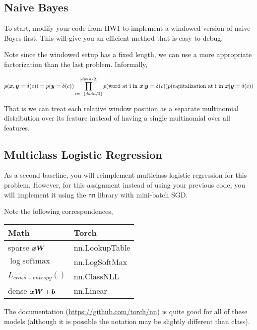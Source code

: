 \documentclass[11pt]{article}
\begin{document}
\subsection{Naive Bayes}

To start, modify your code from HW1
to implement a windowed version of
naive Bayes first. This will give
you an efficient method that is easy
to debug.

Note since the windowed setup has a fixed length, we can use a more appropriate 
factorization than the last problem. Informally,

\[ p(\boldsymbol{x}, \boldsymbol{y}=\delta(c)) = p(\boldsymbol{y}=\delta(c)) \prod_{i=-\lfloor{dwin/2}\rfloor}^{\lfloor{dwin/2}\rfloor}
p(\mathrm{word\ at\ i\ in\ }\boldsymbol{x} | \boldsymbol{y} =\delta(c))
p(\mathrm{capitalization\ at\ i\ in\ }\boldsymbol{x} | \boldsymbol{y} =\delta(c)) \]

That is we can treat each relative window position as a separate
multinomial distribution over its feature instead of having a single
multinomial over all features.


\subsection{Multiclass Logistic Regression}

As a second baseline, you will reimplement multiclass logistic
regression for this problem. However, for this assignment instead of
using your previous code, you will implement it using the \texttt{nn}
library with mini-batch SGD.



Note the following correspondences,

\begin{center}
  \begin{tabular}{ll}
    \toprule
    Math & Torch \\
    \midrule 
    sparse $\boldsymbol{x} \boldsymbol{W}$ & nn.LookupTable \\ 
    $\log \mathrm{softmax}$ & nn.LogSoftMax \\ 
    $L_{cross-entropy}()$ & nn.ClassNLL \\ 
    dense $\boldsymbol{x} \boldsymbol{W} + \boldsymbol{b}$ & nn.Linear \\ 
    \bottomrule
  \end{tabular}
\end{center}
The documentation (\url{https://github.com/torch/nn}) is quite good
for all of these models (although it is possible the notation may be
slightly different than class).
\end{document}
